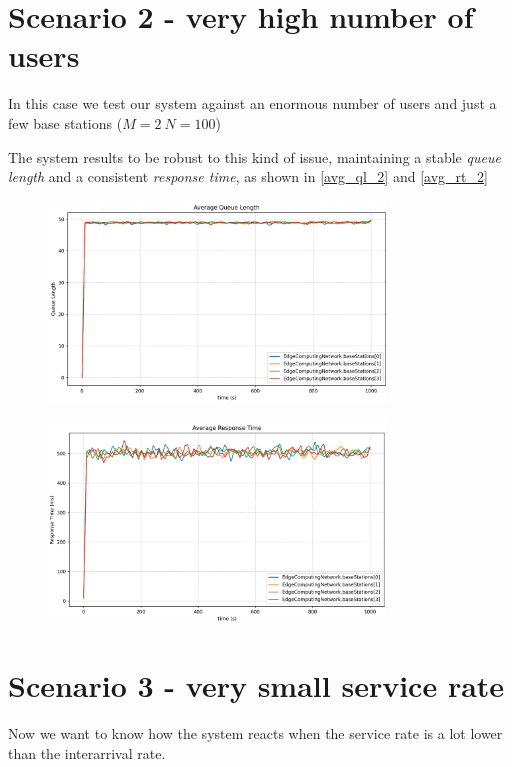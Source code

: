 \documentclass{report}
\begin{document}
\section{Scenario 2 - very high number of users}
In this case we test our system against an enormous number of users and just a few base stations ($M=2 \ N=100$)

The system results to be robust to this kind of issue, maintaining a stable \textit{queue length} and a consistent \textit{response time}, as shown in \autoref{avg_ql_2} and \autoref{avg_rt_2}

\begin{figure}[H]
    \centering
    \includegraphics[width=0.8\textwidth]{img/avg_ql_2.png}
    \caption{}
    \label{avg_ql_2}
\end{figure}
\begin{figure}[H]
    \centering
    \includegraphics[width=0.8\textwidth]{img/avg_rt_2.png}
    \caption{}
    \label{avg_rt_2}
\end{figure}

\section{Scenario 3 - very small service rate}
Now we want to know how the system reacts when the service rate is a lot lower than the interarrival rate.
\end{document}

